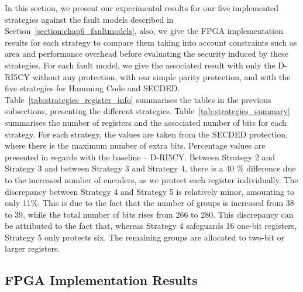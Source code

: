 In this section, we present our experimental results for our five implemented strategies against the fault models described in Section~\ref{section:chap6_faultmodels}, also, we give the FPGA implementation results for each strategy to compare them taking into account constraints such as area and performance overhead before evaluating the security induced by these strategies. For each fault model, we give the associated result with only the D-RI5CY without any protection, with our simple parity protection, and with the five strategies for Hamming Code and SECDED.
Table~\ref{tab:strategies_register_info} summarises the tables in the previous subsections, presenting the different strategies. Table~\ref{tab:strategies_summary} summarises the number of registers and the associated number of bits for each strategy. For each strategy, the values are taken from the SECDED protection, where there is the maximum number of extra bits. Percentage values are presented in regards with the baseline -- D-RI5CY. Between Strategy 2 and Strategy 3 and between Strategy 3 and Strategy 4, there is a 40 \% difference due to the increased number of encoders, as we protect each register individually. The discrepancy between Strategy 4 and Strategy 5 is relatively minor, amounting to only 11\%. This is due to the fact that the number of groups is increased from 38 to 39, while the total number of bits rises from 266 to 280. This discrepancy can be attributed to the fact that, whereas Strategy 4 safeguards 16 one-bit registers, Strategy 5 only protects six. The remaining groups are allocated to two-bit or larger registers. 

\subsection{FPGA Implementation Results}

